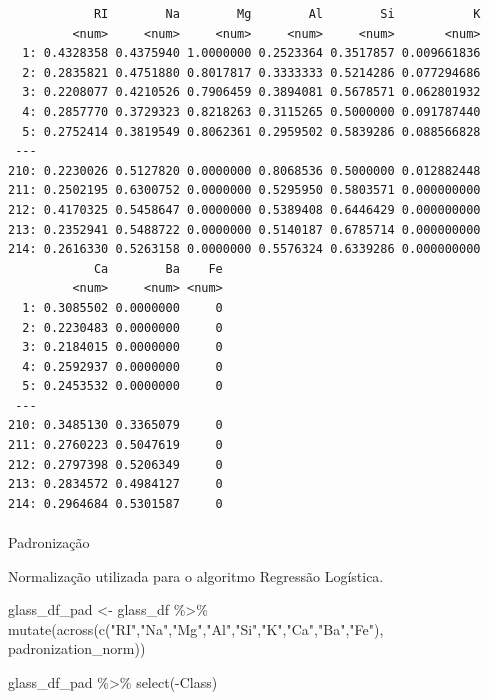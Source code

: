 \documentclass[
  letterpaper,
  DIV=11,
  numbers=noendperiod]{scrartcl}
\makeatletter
\let\oldparagraph\paragraph
\renewcommand{\paragraph}{
    \@ifstar
      \xxxParagraphStar
      \xxxParagraphNoStar
  }
\newcommand{\xxxParagraphStar}[1]{\oldparagraph*{#1}\mbox{}}
\newcommand{\xxxParagraphNoStar}[1]{\oldparagraph{#1}\mbox{}}
\newenvironment{Shaded}{\begin{snugshade}}{\end{snugshade}}
\newcommand{\FunctionTok}[1]{\textcolor[rgb]{0.28,0.35,0.67}{#1}}
\newcommand{\NormalTok}[1]{\textcolor[rgb]{0.00,0.23,0.31}{#1}}
\newcommand{\OtherTok}[1]{\textcolor[rgb]{0.00,0.23,0.31}{#1}}
\newcommand{\SpecialCharTok}[1]{\textcolor[rgb]{0.37,0.37,0.37}{#1}}
\newcommand{\StringTok}[1]{\textcolor[rgb]{0.13,0.47,0.30}{#1}}
\makeatother
\begin{document}
\begin{verbatim}
            RI        Na        Mg        Al        Si           K
         <num>     <num>     <num>     <num>     <num>       <num>
  1: 0.4328358 0.4375940 1.0000000 0.2523364 0.3517857 0.009661836
  2: 0.2835821 0.4751880 0.8017817 0.3333333 0.5214286 0.077294686
  3: 0.2208077 0.4210526 0.7906459 0.3894081 0.5678571 0.062801932
  4: 0.2857770 0.3729323 0.8218263 0.3115265 0.5000000 0.091787440
  5: 0.2752414 0.3819549 0.8062361 0.2959502 0.5839286 0.088566828
 ---                                                              
210: 0.2230026 0.5127820 0.0000000 0.8068536 0.5000000 0.012882448
211: 0.2502195 0.6300752 0.0000000 0.5295950 0.5803571 0.000000000
212: 0.4170325 0.5458647 0.0000000 0.5389408 0.6446429 0.000000000
213: 0.2352941 0.5488722 0.0000000 0.5140187 0.6785714 0.000000000
214: 0.2616330 0.5263158 0.0000000 0.5576324 0.6339286 0.000000000
            Ca        Ba    Fe
         <num>     <num> <num>
  1: 0.3085502 0.0000000     0
  2: 0.2230483 0.0000000     0
  3: 0.2184015 0.0000000     0
  4: 0.2592937 0.0000000     0
  5: 0.2453532 0.0000000     0
 ---                          
210: 0.3485130 0.3365079     0
211: 0.2760223 0.5047619     0
212: 0.2797398 0.5206349     0
213: 0.2834572 0.4984127     0
214: 0.2964684 0.5301587     0
\end{verbatim}

\paragraph{Padronização}\label{padronizauxe7uxe3o-1}

Normalização utilizada para o algoritmo Regressão Logística.

\begin{Shaded}
\begin{Highlighting}[]
\NormalTok{glass\_df\_pad }\OtherTok{\textless{}{-}}\NormalTok{ glass\_df }\SpecialCharTok{\%\textgreater{}\%} 
  \FunctionTok{mutate}\NormalTok{(}\FunctionTok{across}\NormalTok{(}\FunctionTok{c}\NormalTok{(}\StringTok{"RI"}\NormalTok{,}\StringTok{"Na"}\NormalTok{,}\StringTok{"Mg"}\NormalTok{,}\StringTok{"Al"}\NormalTok{,}\StringTok{"Si"}\NormalTok{,}\StringTok{"K"}\NormalTok{,}\StringTok{"Ca"}\NormalTok{,}\StringTok{"Ba"}\NormalTok{,}\StringTok{"Fe"}\NormalTok{), padronization\_norm))}

\NormalTok{glass\_df\_pad }\SpecialCharTok{\%\textgreater{}\%} 
  \FunctionTok{select}\NormalTok{(}\SpecialCharTok{{-}}\NormalTok{Class)}
\end{Highlighting}
\end{Shaded}
\end{document}
